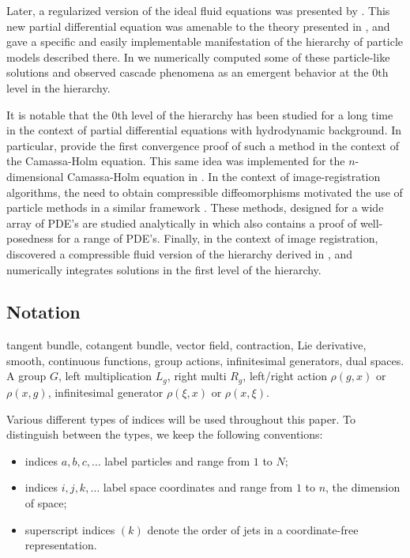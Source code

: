 \documentclass[12pt]{amsart}
\begin{document}
 Later, a regularized version of the ideal fluid equations was presented by
 \cite{MumfordMichor2013}.
 This new partial differential equation was amenable to the theory presented in 
 \cite{JacobsRatiuDesbrun2013}, and gave a specific and easily
 implementable manifestation of the hierarchy of particle models
 described there.
 In \cite{CotterHolmJacobsMeier2014} we numerically computed some
 of these particle-like solutions and observed cascade phenomena as
 an emergent behavior at the $0$th level in the hierarchy.

 It is notable that the $0$th level of the hierarchy has been studied
 for a long time in the context of partial differential equations with hydrodynamic background.
 In particular, \cite{HoldenRaynaud2006} provide the first convergence proof of such a method in the context of the Camassa-Holm equation.
 This same idea was implemented for the $n$-dimensional Camassa-Holm
 equation in \cite{ChertockDuToitMarsden2012}.
 In the context of image-registration algorithms, the need to obtain 
 compressible diffeomorphisms motivated the use of particle methods
 in a similar framework \cite{JoshiMiller2000}.
 These methods, designed for a wide array of PDE's are studied analytically
 in \cite{TrouveYounes2005} which also contains a proof of well-posedness
 for a range of PDE's.
 Finally, in the context of image registration, \cite{Sommer2013} 
 discovered a compressible fluid version of the hierarchy derived in \cite{JacobsRatiuDesbrun2013},
 and numerically integrates solutions in the first level of the hierarchy.

\subsection{Notation}
tangent bundle, cotangent bundle, vector field, contraction, Lie derivative,
smooth, continuous functions, group actions, infinitesimal generators,
dual spaces.  A group $G$, left multiplication $L_g$, right multi $R_g$, 
left/right action $\rho(g,x)$ or $\rho(x,g)$, infinitesimal generator $\rho(\xi,x)$ or $\rho(x,\xi)$.

Various different types of indices will be used throughout this paper.
To distinguish between the types, we keep the following
conventions:
\begin{itemize}
\item indices $a,b,c,\ldots$ label particles and range from $1$ to $N$;
\item indices $i,j,k,\ldots$ label space coordinates and range from
  $1$ to $n$, the dimension of space;
\item superscript indices $(k)$ denote the order of jets in a
  coordinate-free representation.
\end{itemize}
\end{document}
